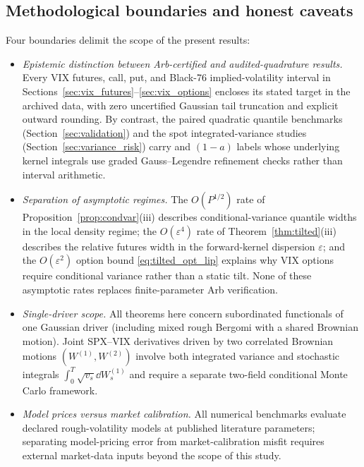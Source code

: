 \subsection{Methodological boundaries and honest caveats}
Four boundaries delimit the scope of the present results:
\begin{itemize}
\item \emph{Epistemic distinction between Arb-certified and audited-quadrature results.} Every VIX
  futures, call, put, and Black-76 implied-volatility interval in Sections~\ref{sec:vix_futures}--\ref{sec:vix_options}
  encloses its stated target in the archived data, with zero uncertified
  Gaussian tail truncation and explicit outward rounding. By contrast, the paired quadratic quantile
  benchmarks (Section~\ref{sec:validation}) and the spot integrated-variance studies
  (Section~\ref{sec:variance_risk}) carry  and $(1-a)$
  labels whose underlying kernel integrals use graded Gauss--Legendre refinement checks rather than
  interval arithmetic.
\item \emph{Separation of asymptotic regimes.} The $O(P^{1/2})$ rate of Proposition~\ref{prop:condvar}(iii)
  describes conditional-variance quantile widths in the local density regime; the $O(\varepsilon^4)$ rate
  of Theorem~\ref{thm:tilted}(iii) describes the relative futures width in the forward-kernel dispersion
  $\varepsilon$; and the $O(\varepsilon^2)$ option bound \eqref{eq:tilted_opt_lip} explains why VIX
  options require conditional variance rather than a static tilt. None of these asymptotic rates replaces
  finite-parameter Arb verification.
\item \emph{Single-driver scope.} All theorems here concern subordinated functionals of one Gaussian
  driver (including mixed rough Bergomi with a shared Brownian motion). Joint SPX--VIX derivatives driven
  by two correlated Brownian motions $(W^{(1)},W^{(2)})$ involve both integrated variance and stochastic
  integrals $\int_0^T\sqrt{v_s}\dd W_s^{(1)}$ and require a separate two-field conditional Monte Carlo
  framework.
\item \emph{Model prices versus market calibration.} All numerical benchmarks evaluate declared
  rough-volatility models at published literature parameters; separating model-pricing error from
  market-calibration misfit requires external market-data inputs beyond the scope of this study.
\end{itemize}

